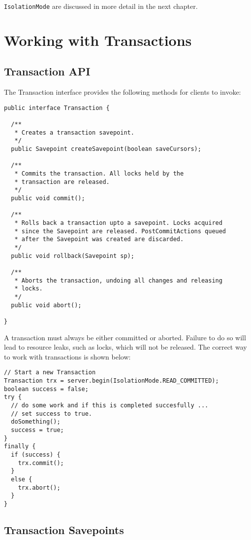 \documentclass[a4paper,draft,oneside]{book}
\begin{document}
\verb|IsolationMode| are discussed in more detail in the next chapter.

\section{Working with Transactions}

\subsection{Transaction API}

The Transaction interface provides the following methods for clients
to invoke:

\begin{verbatim}
public interface Transaction {
	
  /**
   * Creates a transaction savepoint.
   */
  public Savepoint createSavepoint(boolean saveCursors);

  /**
   * Commits the transaction. All locks held by the
   * transaction are released.
   */
  public void commit();	

  /**
   * Rolls back a transaction upto a savepoint. Locks acquired
   * since the Savepoint are released. PostCommitActions queued
   * after the Savepoint was created are discarded.
   */
  public void rollback(Savepoint sp);	

  /**
   * Aborts the transaction, undoing all changes and releasing 
   * locks.
   */
  public void abort();

}
\end{verbatim}

A transaction must always be either committed or aborted. Failure to
do so will lead to resource leaks, such as locks, which will not be
released.  The correct way to work with transactions is shown below:

\begin{verbatim}
// Start a new Transaction
Transaction trx = server.begin(IsolationMode.READ_COMMITTED);
boolean success = false;
try {
  // do some work and if this is completed succesfully ...
  // set success to true.
  doSomething();
  success = true;
}
finally {
  if (success) {
    trx.commit();
  }
  else {
    trx.abort();
  }
}
\end{verbatim}

\subsection{Transaction Savepoints}
\end{document}
